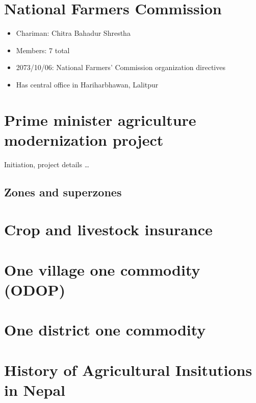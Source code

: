 \documentclass[
  openany]{book}
\providecommand{\tightlist}{%
  \setlength{\itemsep}{0pt}\setlength{\parskip}{0pt}}
\begin{document}
\hypertarget{national-farmers-commission}{%
\section{National Farmers Commission}\label{national-farmers-commission}}

\begin{itemize}
\tightlist
\item
  Chariman: Chitra Bahadur Shrestha
\item
  Members: 7 total
\item
  2073/10/06: National Farmers' Commission organization directives
\item
  Has central office in Hariharbhawan, Lalitpur
\end{itemize}

\hypertarget{prime-minister-agriculture-modernization-project}{%
\section{Prime minister agriculture modernization project}\label{prime-minister-agriculture-modernization-project}}

Initiation, project details \ldots{}

\hypertarget{zones-and-superzones}{%
\subsection{Zones and superzones}\label{zones-and-superzones}}

\hypertarget{crop-and-livestock-insurance}{%
\section{Crop and livestock insurance}\label{crop-and-livestock-insurance}}

\hypertarget{one-village-one-commodity-odop}{%
\section{One village one commodity (ODOP)}\label{one-village-one-commodity-odop}}

\hypertarget{one-district-one-commodity}{%
\section{One district one commodity}\label{one-district-one-commodity}}

\hypertarget{history-of-agricultural-insitutions-in-nepal}{%
\section{History of Agricultural Insitutions in Nepal}\label{history-of-agricultural-insitutions-in-nepal}}
\end{document}
